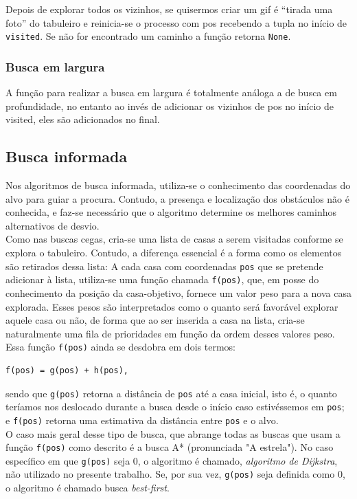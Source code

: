 \documentclass[12pt]{article}
\begin{document}
Depois de explorar todos os vizinhos, se quisermos criar um gif é “tirada uma foto” do tabuleiro e reinicia-se o processo com pos recebendo a tupla no início de \verb|visited|.
Se não for encontrado um caminho a função retorna \verb|None|.


\subsubsection{Busca em largura}
A função para realizar a busca em largura é totalmente análoga a de busca em profundidade, no entanto ao invés de adicionar os vizinhos de pos no início de visited, eles são adicionados no final.


\subsection{Busca informada}
Nos algoritmos de busca informada, utiliza-se o conhecimento das coordenadas do alvo para guiar a procura. Contudo, a presença e localização dos obstáculos não é conhecida, e faz-se necessário que o algoritmo determine os melhores caminhos alternativos de desvio.\\

Como nas buscas cegas, cria-se uma lista de casas a serem visitadas conforme se explora o tabuleiro. Contudo, a diferença essencial é a forma como os elementos são retirados dessa lista: A cada casa com coordenadas \verb|pos| que se pretende adicionar à lista, utiliza-se uma função chamada \verb|f(pos)|, que, em posse do conhecimento da posição da casa-objetivo, fornece um valor peso para a nova casa explorada. Esses pesos são interpretados como o quanto será favorável explorar aquele casa ou não, de forma que ao ser inserida a casa na lista, cria-se naturalmente uma fila de prioridades em função da ordem desses valores peso.\\

Essa função \verb|f(pos)| ainda se desdobra em dois termos:

\begin{verbatim}
f(pos) = g(pos) + h(pos),
\end{verbatim}

sendo que \verb|g(pos)| retorna a distância de \verb|pos| até a casa inicial, isto é, o quanto teríamos nos deslocado durante a busca desde o início caso estivéssemos em \verb|pos|; e \verb|f(pos)| retorna uma estimativa da distância entre \verb|pos| e o alvo.\\

O caso mais geral desse tipo de busca, que abrange todas as buscas que usam a função \verb|f(pos)| como descrito é a busca A* (pronunciada "A estrela"). No caso específico em que \verb|g(pos)| seja 0, o algoritmo é chamado, \emph{algoritmo de Dijkstra}, não utilizado no presente trabalho. Se, por sua vez, \verb|g(pos)| seja definida como 0, o algoritmo é chamado busca \emph{best-first}.\\
\end{document}
